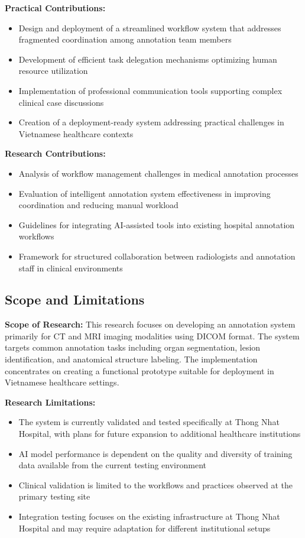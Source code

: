 \textbf{Practical Contributions:}
\begin{itemize}
    \item Design and deployment of a streamlined workflow system that addresses fragmented coordination among annotation team members
    \item Development of efficient task delegation mechanisms optimizing human resource utilization
    \item Implementation of professional communication tools supporting complex clinical case discussions
    \item Creation of a deployment-ready system addressing practical challenges in Vietnamese healthcare contexts
\end{itemize}

\textbf{Research Contributions:}
\begin{itemize}
    \item Analysis of workflow management challenges in medical annotation processes
    \item Evaluation of intelligent annotation system effectiveness in improving coordination and reducing manual workload
    \item Guidelines for integrating AI-assisted tools into existing hospital annotation workflows
    \item Framework for structured collaboration between radiologists and annotation staff in clinical environments
\end{itemize}

\subsection{Scope and Limitations}

\textbf{Scope of Research:}
This research focuses on developing an annotation system primarily for CT and MRI imaging modalities using DICOM format. The system targets common annotation tasks including organ segmentation, lesion identification, and anatomical structure labeling. The implementation concentrates on creating a functional prototype suitable for deployment in Vietnamese healthcare settings.

\textbf{Research Limitations:}
\begin{itemize}
    \item The system is currently validated and tested specifically at Thong Nhat Hospital, with plans for future expansion to additional healthcare institutions
    \item AI model performance is dependent on the quality and diversity of training data available from the current testing environment
    \item Clinical validation is limited to the workflows and practices observed at the primary testing site
    \item Integration testing focuses on the existing infrastructure at Thong Nhat Hospital and may require adaptation for different institutional setups
\end{itemize}

